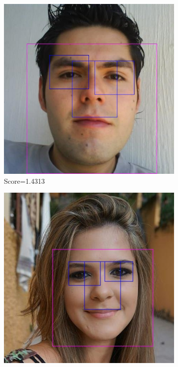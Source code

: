 \begin{figure}
    \centering
    \begin{subfigure}[b]{0.3\textwidth}
      \includegraphics[width=\textwidth]{figures/results/detected_cff0618f-f631-4b0d-80d9-f582fee46fad}
      \caption{Score=1.4313}
      \label{fig:results:fd:good_detected1}
    \end{subfigure}
    \begin{subfigure}[b]{0.3\textwidth}
      \includegraphics[width=\textwidth]{figures/results/detected_50508cb1-814e-4374-bf07-cef5c301c3c0}

\end{subfigure}
\end{figure}
